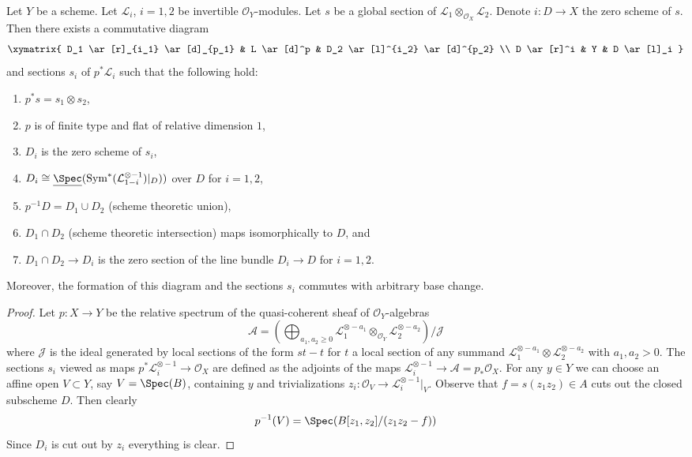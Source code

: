 \begin{lemma}
\label{lemma-decompose-section}
Let $Y$ be a scheme. Let $\mathcal{L}_i$, $i = 1, 2$ be invertible
$\mathcal{O}_Y$-modules. Let $s$ be a global section of
$\mathcal{L}_1 \otimes_{\mathcal{O}_X} \mathcal{L}_2$.
Denote $i : D \to X$ the zero scheme of $s$.
Then there exists a commutative diagram
$$
\xymatrix{
D_1 \ar[r]_{i_1} \ar[d]_{p_1} &
L \ar[d]^p &
D_2 \ar[l]^{i_2} \ar[d]^{p_2} \\
D \ar[r]^i &
Y &
D \ar[l]_i
}
$$
and sections $s_i$ of $p^*\mathcal{L}_i$ such that
the following hold:
\begin{enumerate}
\item $p^*s = s_1 \otimes s_2$,
\item $p$ is of finite type and flat of relative dimension $1$,
\item $D_i$ is the zero scheme of $s_i$,
\item $D_i \cong
\underline{\Spec}(\text{Sym}^*(\mathcal{L}_{1 - i}^{\otimes -1})|_D))$
over $D$ for $i = 1, 2$,
\item $p^{-1}D = D_1 \cup D_2$ (scheme theoretic union),
\item $D_1 \cap D_2$ (scheme theoretic intersection) maps
isomorphically to $D$, and
\item $D_1 \cap D_2 \to D_i$
is the zero section of the line bundle $D_i \to D$ for $i = 1, 2$.
\end{enumerate}
Moreover, the formation of this diagram and the sections $s_i$
commutes with arbitrary base change.
\end{lemma}

\begin{proof}
Let $p : X \to Y$ be the relative spectrum of the quasi-coherent
sheaf of $\mathcal{O}_Y$-algebras
$$
\mathcal{A} =
\left(\bigoplus\nolimits_{a_1, a_2 \geq 0}
\mathcal{L}_1^{\otimes -a_1} \otimes_{\mathcal{O}_Y}
\mathcal{L}_2^{\otimes -a_2}\right)/\mathcal{J}
$$
where $\mathcal{J}$ is the ideal generated by local sections of
the form $st - t$ for $t$ a local section of any summand
$\mathcal{L}_1^{\otimes -a_1} \otimes \mathcal{L}_2^{\otimes -a_2}$
with $a_1, a_2 > 0$. The sections $s_i$ viewed as maps
$p^*\mathcal{L}_i^{\otimes -1} \to \mathcal{O}_X$ are defined as the adjoints
of the maps $\mathcal{L}_i^{\otimes -1} \to \mathcal{A} = p_*\mathcal{O}_X$.
For any $y \in Y$ we can choose an affine
open $V \subset Y$, say $V = \Spec(B)$, containing $y$ and
trivializations $z_i : \mathcal{O}_V \to \mathcal{L}_i^{\otimes -1}|_V$.
Observe that $f = s(z_1z_2) \in A$ cuts out the closed subscheme $D$.
Then clearly
$$
p^{-1}(V) = \Spec(B[z_1, z_2]/(z_1 z_2 - f))
$$
Since $D_i$ is cut out by $z_i$ everything is clear.
\end{proof}

